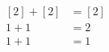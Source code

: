 \documentclass[preview]{standalone}
\begin{document}
\begin{align*}
\begin{aligned}[2] + [2] &= [2] \\1 + 1 &= 2 \\1 + 1 &= 1 \end{aligned}
\end{align*}
\end{document}
